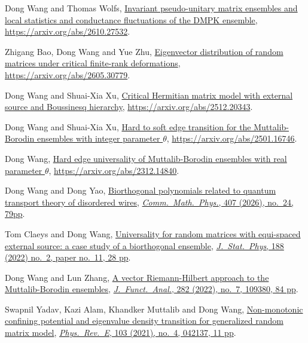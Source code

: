 \begin{etaremune}
\item
  Dong Wang and Thomas Wolfs, \href{https://arxiv.org/abs/2610.27532}{Invariant pseudo-unitary matrix ensembles and local statistics and conductance fluctuations of the DMPK ensemble}, \url{https://arxiv.org/abs/2610.27532}.
\item
  Zhigang Bao, Dong Wang and Yue Zhu, \href{https://arxiv.org/abs/2605.30779}{Eigenvector distribution of random matrices under critical finite-rank deformations}, \url{https://arxiv.org/abs/2605.30779}.
\item
  Dong Wang and Shuai-Xia Xu, \href{https://arxiv.org/abs/2512.20343}{Critical Hermitian matrix model with external source and Boussinesq hierarchy}, \url{https://arxiv.org/abs/2512.20343}.
\item
  Dong Wang and Shuai-Xia Xu, \href{https://arxiv.org/abs/2501.16746}{Hard to soft edge transition for the Muttalib-Borodin ensembles with integer parameter $\theta$}, \url{https://arxiv.org/abs/2501.16746}.
\item
  Dong Wang, \href{https://arxiv.org/abs/2312.14840}{Hard edge universality of Muttalib-Borodin ensembles with real parameter $\theta$}, \url{https://arxiv.org/abs/2312.14840}.
\item
  Dong Wang and Dong Yao, \href{https://arxiv.org/abs/2307.03720}{Biorthogonal polynomials related to quantum transport theory of disordered wires}, \href{https://doi.org/10.1007/s00220-025-05524-x}{\textit{Comm.\ Math.\ Phys.}, 407 (2026), no.\ 24, 79pp}.
\item
  Tom Claeys and Dong Wang, \href{https://arxiv.org/abs/2202.03827}{Universality for random matrices with equi-spaced external source: a case study of a biorthogonal ensemble}, \href{https://doi.org/10.1007/s10955-022-02937-z}{\textit{J.\ Stat.\ Phys}, 188 (2022) no.\ 2, paper no.\ 11, 28 pp}.
\item
  Dong Wang and Lun Zhang, \href{https://arxiv.org/abs/2103.10327}{A vector Riemann-Hilbert approach to the Muttalib-Borodin ensembles}, \href{https://doi.org/10.1016/j.jfa.2021.109380}{\textit{J.\ Funct.\ Anal.}, 282 (2022), no.\ 7, 109380, 84 pp}.
\item
  Swapnil Yadav, Kazi Alam, Khandker Muttalib and Dong Wang, \href{https://arxiv.org/abs/2010.08856}{Non-monotonic confining potential and eigenvalue density transition for generalized random matrix model}, \href{https://doi.org/10.1103/PhysRevE.103.042137}{\textit{Phys.\ Rev.\ E}, 103 (2021), no.\ 4, 042137, 11 pp}.
\item

\end{etaremune}
